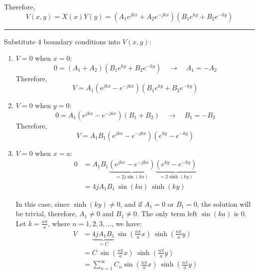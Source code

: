 \documentclass[a4paper, 12pt]{article}
\begin{document}
\begin{mdframed}
Therefore,
\[
    V(x, y)
    = X(x) Y(y) 
    = (A_{1}e^{jkx}+ A_{2}e^{-jkx}) (B_{1}e^{ky}+B_{2}e^{-ky}) 
\]
\hrule \vspace{.3cm}

Substitute 4 boundary conditions into $V(x, y)$:

\begin{enumerate}
    \item $V=0$ when $x=0$:
    \[ 
        0 = (A_{1}+A_{2})(B_{1}e^{ky}+B_{2}e^{-ky}) \quad \to \quad A_{1}=-A_{2}
    \]
    Therefore,
    \[
        V = A_{1}(e^{jkx}-e^{-jkx})(B_{1}e^{ky}+B_{2}e^{-ky})
    \]
    
    \item $V=0$ when $y=0$:
    \[
        0 = A_{1}(e^{jkx}-e^{-jkx})(B_{1}+B_{2}) \quad \to \quad 
        B_{1} = -B_{2} 
    \]
    Therefore,
    \[ 
        V = A_{1}B_{1}(e^{jkx}-e^{-jkx})(e^{ky}-e^{-ky})
    \]
    
   \item $V=0$ when $x=a$:
   \begin{align*} 
        0 
        &= A_{1}B_{1} \underbrace{(e^{jkx}-e^{-jkx})}_{=2j \sin (kx)} \underbrace{(e^{ky}-e^{-ky})}_{=2\sinh(ky)}\\[.5em]
        &= 4j A_{1}B_{1} \ \sin(ka) \ \sinh(ky)
    \end{align*}
    
    In this case, since $\sinh(ky)\neq 0$, and if $A_1 = 0$ or $B_1 = 0$, the solution will be trivial, therefore, $A_1\neq 0$ and $B_1\neq 0$. The only term left $\sin(ka)$ is 0. Let $k=\frac{n\pi}{a}$, where $n=1, 2, 3, ...$, we have:
    \begin{align*} 
    V 
        &= \underbrace{4 j A_{1} B_{1}}_{=C} \ \sin \left(\frac{n\pi}{a} x \right) \ \sinh \left(\frac{n\pi}{a} y \right) \\
        &= C \ \sin \left(\frac{n\pi}{a} x \right) \ \sinh \left( \frac{n\pi}{a} y \right)\\
     &= \sum^{\infty}_{n=1} C_{n} \sin \left( \frac{n\pi}{a} x \right) \ \sinh \left( \frac{n\pi}{a} y \right)
    \end{align*}
    

\end{enumerate}
\end{mdframed}
\end{document}
